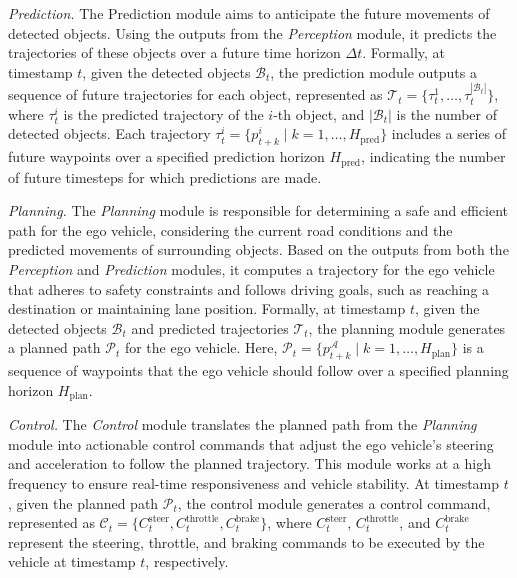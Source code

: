\textit{Prediction.} The Prediction module aims to anticipate the future movements of detected objects. Using the outputs from the \textit{Perception} module, it predicts the trajectories of these objects over a future time horizon $\Delta t$. Formally, at timestamp $t$, given the detected objects $\mathcal{B}_{t}$, the prediction module outputs a sequence of future trajectories for each object, represented as $\mathcal{T}_{t}  = \{\tau_{t}^{1}, \ldots, \tau_{t}^{|\mathcal{B}_{t}|}\}$, where $\tau_{t}^{i}$ is the predicted trajectory of the $i$-th object, and $|\mathcal{B}_{t}|$ is the number of detected objects. Each trajectory $\tau_{t}^{i} = \{p_{t+k}^{i} \mid k = 1, \ldots, H_{\text{pred}}\}$ includes a series of future waypoints over a specified prediction horizon $H_{\text{pred}}$, indicating the number of future timesteps for which predictions are made.


\textit{Planning.} The \textit{Planning} module is responsible for determining a safe and efficient path for the ego vehicle, considering the current road conditions and the predicted movements of surrounding objects. Based on the outputs from both the \textit{Perception} and \textit{Prediction} modules, it computes a trajectory for the ego vehicle that adheres to safety constraints and follows driving goals, such as reaching a destination or maintaining lane position. Formally, at timestamp $t$, given the detected objects $\mathcal{B}_{t}$ and predicted trajectories $\mathcal{T}_{t}$, the planning module generates a planned path $\mathcal{P}_{t}$ for the ego vehicle. Here, $\mathcal{P}_{t} = \{p_{t+k}^{\mathcal{A}} \mid k = 1, \ldots, H_{\text{plan}}\}$ is a sequence of waypoints that the ego vehicle should follow over a specified planning horizon $H_{\text{plan}}$.

\textit{Control.} The \textit{Control} module translates the planned path from the \textit{Planning} module into actionable control commands that adjust the ego vehicle’s steering and acceleration to follow the planned trajectory. This module works at a high frequency to ensure real-time responsiveness and vehicle stability. At timestamp $t$, given the planned path $\mathcal{P}_{t}$, the control module generates a control command, represented as $\mathcal{C}_{t} = \{C_{t}^{\text{steer}}, C_{t}^{\text{throttle}}, C_{t}^{\text{brake}}\}$, where $C_{t}^{\text{steer}}$, $C_{t}^{\text{throttle}}$, and $C_{t}^{\text{brake}}$ represent the steering, throttle, and braking commands to be executed by the vehicle at timestamp $t$, respectively.


